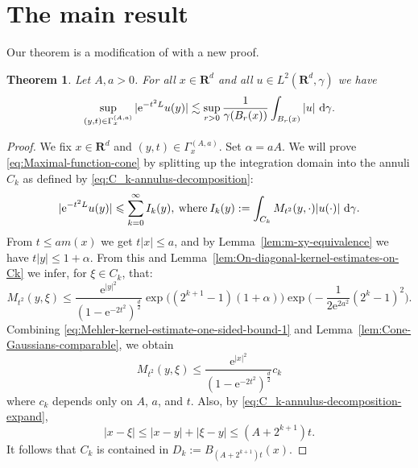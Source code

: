 \documentclass{amsart}
\newtheorem{theorem}{Theorem}
\theoremstyle{remark}
\newcommand{\D}{\,\textup{d}}
\newcommand{\LHG}{{L^2(\R^d,\gamma)}}
\renewcommand{\leq}{\leqslant}
\renewcommand{\leq}{\leqslant}
\newcommand{\R}{\mathbf R}
\newcommand{\e}{\mathrm{e}} %
\renewcommand{\leq}{\leqslant}%
\begin{document}
\section{The main result}
Our theorem is a modification of \cite[lemma 1.1]{Pineda2008} with a new proof.
\begin{theorem}\label{thm:Gaussian-maximal-function}
  Let $A, a > 0$. For all $x\in \R^d$ and all $u \in \LHG$ we have
  \begin{equation}
    \label{eq:Maximal-function-cone}
    \sup_{(y, t) \in \Gamma_x^{(A, a)}} |\e^{-t^2 L} u(y)| \lesssim
    \sup_{r > 0} \frac1{\gamma(B_r(x))}\int_{B_r(x)} |u| \, \D\gamma.
  \end{equation}
\end{theorem}
\begin{proof}
  We fix $x \in \R^d$ and $ (y, t) \in \Gamma_x^{(A, a)}$. 
  Set $\alpha = aA$. 
  We will prove \eqref{eq:Maximal-function-cone} by splitting up the
  integration domain into the annuli $C_k$ as defined by
  \eqref{eq:C_k-annulus-decomposition}: 
  \begin{equation}
    \label{eq:Maximal-function-cone-intermediate-step-1}
    |\e^{-t^2 L} u(y)| \leq \sum_{k = 0}^\infty I_k(y),
    \:\text{where}\: I_k(y) := \int_{C_k} M_{t^2}(y, \cdot) |u(\cdot)|
    \,\D\gamma.
  \end{equation} 
  From $t \leq a m(x)$ we get $t |x| \leq a$, and by
  Lemma~\ref{lem:m-xy-equivalence} we have $t |y| \leq 1 + \alpha$. From this
  and Lemma~\ref{lem:On-diagonal-kernel-estimates-on-Ck} we infer, for $\xi \in
  C_k$, that:
  \begin{equation}
    \label{eq:Mehler-kernel-estimate-one-sided-bound-1}
    M_{t^2}(y, \xi) \leq  \frac{\e^{|y|^2}}{(1 - \e^{-2t^2})^{\frac{d}2}}
    \exp\bigl((2^{k + 1} - 1) (1 + \alpha) \bigr)
    \exp\Big(\!-\!\frac1{2 \e^{2a^2}} (2^k - 1)^2 \Big).
  \end{equation}
  Combining \eqref{eq:Mehler-kernel-estimate-one-sided-bound-1} and
  Lemma~\ref{lem:Cone-Gaussians-comparable}, we obtain
  \begin{equation*}
    M_{t^2}(y, \xi) \leq \frac{\e^{|x|^2}}{(1 - \e^{-2t^2})^{\frac{d}2}} c_k
  \end{equation*}       
  where $c_k$ depends only on $A$, $a$, and $t$. Also, by
  \eqref{eq:C_k-annulus-decomposition-expand},
  \begin{equation*}
    |x - \xi| \leq |x - y| + |\xi - y| \leq (A + 2^{k + 1})t .
  \end{equation*}
  It follows that $ C_k$ is contained in $D_k := B_{(A +2^{k + 1})t}(x)$.


\end{proof}
\end{document}
